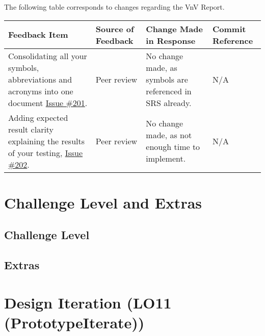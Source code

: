 \documentclass{article}
\begin{document}
The following table corresponds to changes regarding the VnV Report.
\begin{longtable}{|p{4cm}|p{1.5cm}|p{4cm}|p{1.5cm}|}
    \hline
    \textbf{Feedback Item} & \textbf{Source of Feedback} & \textbf{Change Made in Response} & \textbf{Commit Reference} \\
    \hline
    \endfirsthead
    \hline
    \endhead
    \hline
    \endfoot
    \hline
    \endlastfoot
    Consolidating all your symbols, abbreviations and acronyms into one document \href{https://github.com/gr812b/CVT-Simulator/issues/201}{Issue \#201}. & Peer review  & No change made, as symbols are referenced in SRS already. & N/A \\
    \hline
    Adding expected result clarity explaining the results of your testing, \href{https://github.com/gr812b/CVT-Simulator/issues/202}{Issue \#202}. & Peer review  & No change made, as not enough time to implement. & N/A \\
    
    \hline 
\end{longtable}    
\section{Challenge Level and Extras}

\subsection{Challenge Level}


\subsection{Extras}


\section{Design Iteration (LO11 (PrototypeIterate))}
\end{document}
